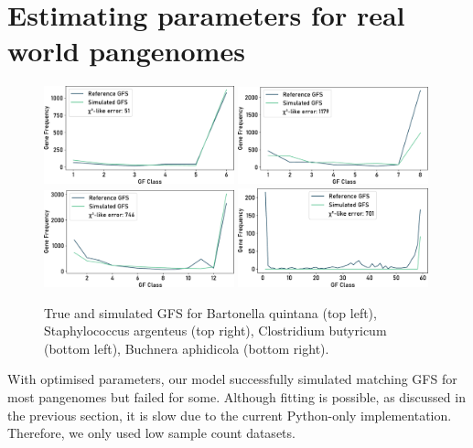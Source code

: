 \section{Estimating parameters for real world pangenomes}
\begin{figure}[H]
    \centering
    \includegraphics[width=0.49\textwidth]{figures/fitted_gfs/803.pdf}
    \includegraphics[width=0.49\textwidth]{figures/fitted_gfs/985002.pdf}\\
    \includegraphics[width=0.49\textwidth]{figures/fitted_gfs/1492.pdf}
    \includegraphics[width=0.49\textwidth]{figures/fitted_gfs/9.pdf}\\
    \caption[Fitted GFS for real-world pangenomes.]{True and simulated GFS for Bartonella quintana (top left), Staphylococcus argenteus (top right), Clostridium butyricum (bottom left), Buchnera aphidicola (bottom right).}
    \label{fig:fitted-gfs}
\end{figure}
With optimised parameters, our model successfully simulated matching GFS for most pangenomes but failed for some.
Although fitting is possible, as discussed in the previous section, it is slow due to the current Python-only implementation.
Therefore, we only used low sample count datasets.

